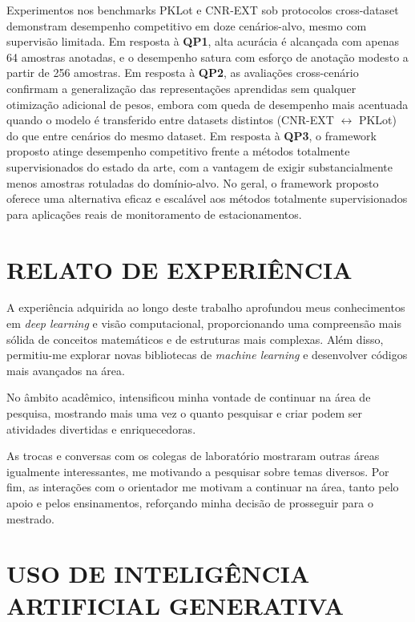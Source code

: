 \documentclass{article}
\begin{document}
Experimentos nos benchmarks PKLot e CNR-EXT sob protocolos cross-dataset demonstram desempenho competitivo em doze cenários-alvo, mesmo com supervisão limitada. Em resposta à \textbf{QP1}, alta acurácia é alcançada com apenas 64 amostras anotadas, e o desempenho satura com esforço de anotação modesto a partir de 256 amostras. Em resposta à \textbf{QP2}, as avaliações cross-cenário confirmam a generalização das representações aprendidas sem qualquer otimização adicional de pesos, embora com queda de desempenho mais acentuada quando o modelo é transferido entre datasets distintos (CNR-EXT $\leftrightarrow$ PKLot) do que entre cenários do mesmo dataset. Em resposta à \textbf{QP3}, o framework proposto atinge desempenho competitivo frente a métodos totalmente supervisionados do estado da arte, com a vantagem de exigir substancialmente menos amostras rotuladas do domínio-alvo. No geral, o framework proposto oferece uma alternativa eficaz e escalável aos métodos totalmente supervisionados para aplicações reais de monitoramento de estacionamentos.

\section{RELATO DE EXPERIÊNCIA}

A experiência adquirida ao longo deste trabalho aprofundou meus conhecimentos em \textit{deep learning} e visão computacional, proporcionando uma compreensão mais sólida de conceitos matemáticos e de estruturas mais complexas. Além disso, permitiu-me explorar novas bibliotecas de \textit{machine learning} e desenvolver códigos mais avançados na área.

No âmbito acadêmico, intensificou minha vontade de continuar na área de pesquisa, mostrando mais uma vez o quanto pesquisar e criar podem ser atividades divertidas e enriquecedoras. 

As trocas e conversas com os colegas de laboratório mostraram outras áreas igualmente interessantes, me motivando a pesquisar sobre temas diversos. Por fim, as interações com o orientador me motivam a continuar na área, tanto pelo apoio e pelos ensinamentos, reforçando minha decisão de prosseguir para o mestrado.  

\section{USO DE INTELIGÊNCIA ARTIFICIAL GENERATIVA}
\end{document}
